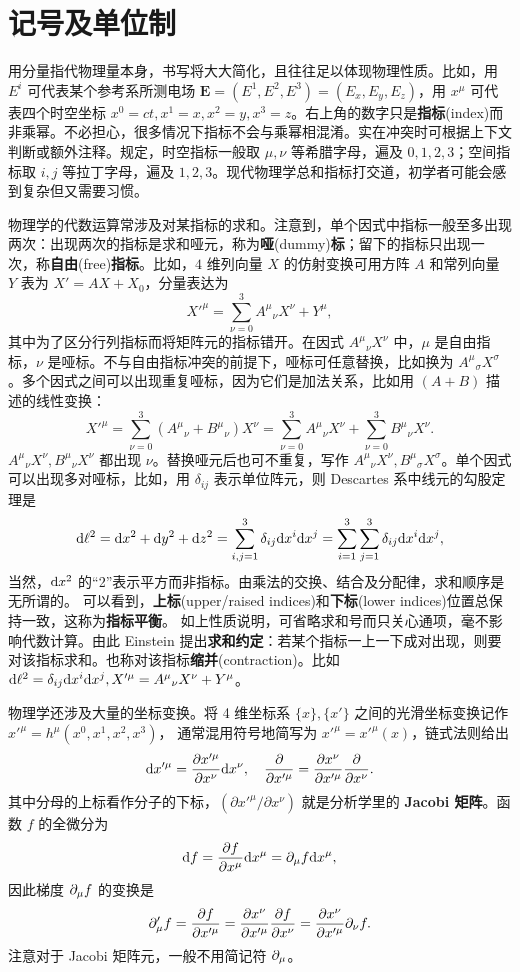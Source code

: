 \chapter*{记号及单位制}

用分量指代物理量本身，书写将大大简化，且往往足以体现物理性质。比如，用 $E^i$ 可代表某个参考系所测电场 $\bm E=(E^1,E^2,E^3)=(E_x,E_y,E_z)$，用 $x^\mu$ 可代表四个时空坐标 $x^0=ct,x^1=x,x^2=y,x^3=z$。右上角的数字只是\textbf{指标}(index)而非乘幂。不必担心，很多情况下指标不会与乘幂相混淆。实在冲突时可根据上下文判断或额外注释。规定，时空指标一般取 $\mu,\nu$ 等希腊字母，遍及 $0,1,2,3$；空间指标取 $i,j$ 等拉丁字母，遍及 $1,2,3$。现代物理学总和指标打交道，初学者可能会感到复杂但又需要习惯。

物理学的代数运算常涉及对某指标的求和。注意到，单个因式中指标一般至多出现两次：出现两次的指标是求和哑元，称为\textbf{哑}(dummy)\textbf{标}；留下的指标只出现一次，称\textbf{自由}(free)\textbf{指标}。比如，$4$ 维列向量 $X$ 的仿射变换可用方阵 $A$ 和常列向量 $Y$ 表为 $X'=AX+X_0$，分量表达为
\[X'^\mu=\sum_{\nu=0}^3 A^{\mu}{}_{\nu}X^\nu+ Y^\mu,\]
其中为了区分行列指标而将矩阵元的指标错开。在因式 $A^{\mu}{}_{\nu}X^\nu$ 中，$\mu$ 是自由指标，$\nu$ 是哑标。不与自由指标冲突的前提下，哑标可任意替换，比如换为 $A^{\mu}{}_{\sigma}X^\sigma$。多个因式之间可以出现重复哑标，因为它们是加法关系，比如用 $(A+B)$ 描述的线性变换：
\[X'^\mu=\sum_{\nu=0}^3 (A^{\mu}{}_{\nu}+B^{\mu}{}_{\nu})X^\nu=\sum_{\nu=0}^3 A^{\mu}{}_{\nu}X^\nu+\sum_{\nu=0}^3 B^{\mu}{}_{\nu}X^\nu.\]
$A^{\mu}{}_{\nu}X^\nu,B^{\mu}{}_{\nu}X^\nu$ 都出现 $\nu$。替换哑元后也可不重复，写作 $A^{\mu}{}_{\nu}X^\nu,B^{\mu}{}_{\sigma}X^\sigma$。单个因式可以出现多对哑标，比如，用 $\delta_{ij}$ 表示单位阵元，则 Descartes 系中线元的勾股定理是
\[\dd\ell^2=\dd x^2+\dd y^2+\dd z^2=\sum_{i,j=1}^3\delta_{ij}\dd x^i\dd x^j=\sum_{i=1}^3\sum_{j=1}^3\delta_{ij}\dd x^i\dd x^j,\]
当然，$\dd x^2$ 的“2”表示平方而非指标。由乘法的交换、结合及分配律，求和顺序是无所谓的。
可以看到，\textbf{上标}(upper/raised indices)和\textbf{下标}(lower indices)位置总保持一致，这称为\textbf{指标平衡}。
如上性质说明，可省略求和号而只关心通项，毫不影响代数计算。由此 Einstein 提出\textbf{求和约定}：若某个指标一上一下成对出现，则要对该指标求和。也称对该指标\textbf{缩并}(contraction)。比如 $\dd\ell^2=\delta_{ij}\dd x^i\dd x^j,X'^\mu=A^{\mu}{}_{\nu}X^\nu+ Y^\mu$。

物理学还涉及大量的坐标变换。将 4 维坐标系 $\{x\},\{x'\}$ 之间的光滑坐标变换记作
$x'^\mu=h^\mu(x^0,x^1,x^2,x^3)$，
通常混用符号地简写为 $x'^\mu=x'^\mu(x)$，链式法则给出
\[
    \dd x'^\mu=\pdv{x'^\mu}{x^\nu}\dd x^\nu,\quad \pdv{x'^\mu} =\pdv{x^\nu}{x'^\mu} \pdv{x^\nu}. 
\]
其中分母的上标看作分子的下标，$({\partial x'^\mu}/{\partial x^\nu})$ 就是分析学里的 \textbf{Jacobi 矩阵}。函数 $f$ 的全微分为
\[
    \dd f=\pdv{f}{x^\mu}\dd x^\mu=\partial_\mu f\dd x^\mu,
\]
因此梯度 $\partial_\mu f$ 的变换是
\[
    \partial'_\mu f=\pdv{f}{x'^\mu}=\pdv{x^\nu}{x'^\mu}\pdv{f}{x^\nu}=\pdv{x^\nu}{x'^\mu}\partial_\nu f.
\]
注意对于 Jacobi 矩阵元，一般不用简记符 $\partial_\mu$。

